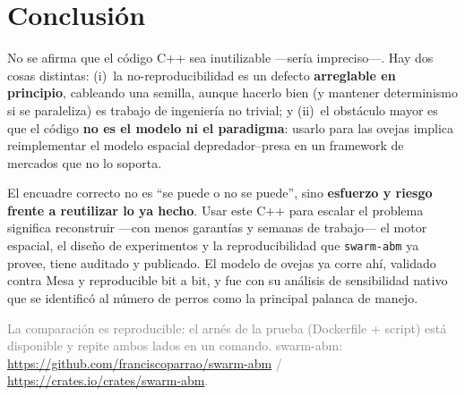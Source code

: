 \documentclass[11pt,a4paper]{article}
\newcommand{\code}[1]{\texttt{\small #1}}
\begin{document}
\section{Conclusión}

No se afirma que el código C++ sea inutilizable —sería impreciso—. Hay dos cosas
distintas: (i)~la no-reproducibilidad es un defecto \textbf{arreglable en
principio}, cableando una semilla, aunque hacerlo bien (y mantener determinismo
si se paraleliza) es trabajo de ingeniería no trivial; y (ii)~el obstáculo mayor
es que el código \textbf{no es el modelo ni el paradigma}: usarlo para las ovejas
implica reimplementar el modelo espacial depredador--presa en un framework de
mercados que no lo soporta.

\begin{tcolorbox}[colback=cop!7,colframe=cop,boxrule=0.6pt,arc=2pt]
El encuadre correcto no es ``se puede o no se puede'', sino \textbf{esfuerzo y
riesgo frente a reutilizar lo ya hecho}. Usar este C++ para escalar el problema
significa reconstruir —con menos garantías y semanas de trabajo— el motor
espacial, el diseño de experimentos y la reproducibilidad que \code{swarm-abm} ya
provee, tiene auditado y publicado. El modelo de ovejas ya corre ahí, validado
contra Mesa y reproducible bit a bit, y fue con su análisis de sensibilidad
nativo que se identificó al número de perros como la principal palanca de manejo.
\end{tcolorbox}

\vspace{6pt}
\noindent\footnotesize\textcolor{gray}{La comparación es reproducible: el arnés
de la prueba (Dockerfile + script) está disponible y repite ambos lados en un
comando. swarm-abm: \url{https://github.com/franciscoparrao/swarm-abm} /
\url{https://crates.io/crates/swarm-abm}.}
\end{document}
